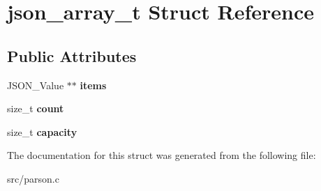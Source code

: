 \hypertarget{structjson__array__t}{\section{json\-\_\-array\-\_\-t Struct Reference}
\label{structjson__array__t}
}
\subsection*{Public Attributes}
\begin{DoxyCompactItemize}
\item 
\hypertarget{structjson__array__t_abef9539699db9baeb8d1b8afd47bbc47}{J\-S\-O\-N\-\_\-\-Value $\ast$$\ast$ {\bfseries items}}\label{structjson__array__t_abef9539699db9baeb8d1b8afd47bbc47}

\item 
\hypertarget{structjson__array__t_a6381130e904211a18c464f6890a7117a}{size\-\_\-t {\bfseries count}}\label{structjson__array__t_a6381130e904211a18c464f6890a7117a}

\item 
\hypertarget{structjson__array__t_a310f6c2b5e880ae4e29c6718a8dd072c}{size\-\_\-t {\bfseries capacity}}\label{structjson__array__t_a310f6c2b5e880ae4e29c6718a8dd072c}

\end{DoxyCompactItemize}


The documentation for this struct was generated from the following file\-:\begin{DoxyCompactItemize}
\item 
src/parson.\-c\end{DoxyCompactItemize}
